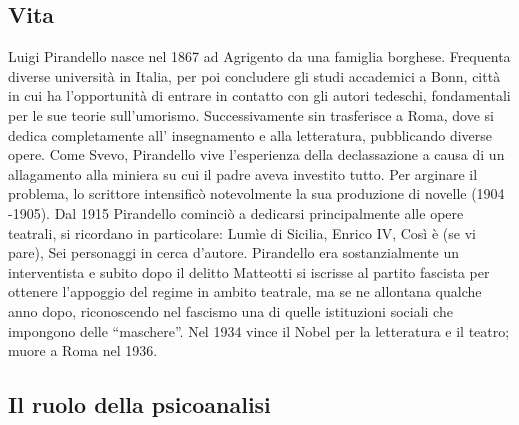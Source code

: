 \documentclass[10pt]{report}
\begin{document}
		\subsection{Vita}
		Luigi Pirandello nasce nel 1867 ad Agrigento da una famiglia borghese. Frequenta diverse università in Italia, per poi concludere gli studi accademici a Bonn, città in cui ha l’opportunità di entrare in contatto con gli autori tedeschi, fondamentali per le sue teorie sull’umorismo.
		Successivamente sin trasferisce a Roma, dove si dedica completamente all’
		insegnamento e alla letteratura, pubblicando diverse opere. 
		Come Svevo, Pirandello vive l’esperienza della declassazione a causa di un allagamento alla miniera su cui il padre aveva investito tutto. Per arginare il problema, lo scrittore intensificò notevolmente la sua produzione di novelle (1904 -1905). Dal 1915 Pirandello cominciò a dedicarsi principalmente alle opere teatrali, si ricordano in particolare: Lumìe di Sicilia, Enrico IV, Così è (se vi pare), Sei personaggi in cerca d’autore.
		Pirandello era sostanzialmente un interventista e subito dopo il delitto Matteotti si iscrisse al partito fascista per ottenere l’appoggio del regime in ambito teatrale, ma se ne allontana qualche anno dopo, riconoscendo nel fascismo una di quelle istituzioni sociali che impongono delle “maschere”. Nel 1934 vince il Nobel per la letteratura e il teatro; muore a Roma nel 1936.
		
		\subsection{Il ruolo della psicoanalisi}
		
\end{document}
